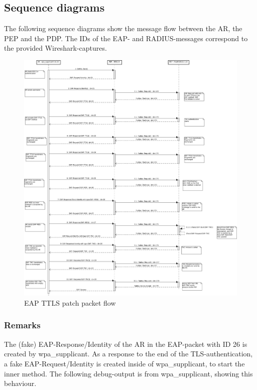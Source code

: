 \subsection{Sequence diagrams}
The following sequence diagrams show the message flow between the AR, the PEP and the PDP.
The IDs of the EAP- and RADIUS-messages correspond to the provided Wireshark-captures.

\begin{figure}[ht]
 \centering
 \includegraphics[width=\textwidth]{freeradius-eapttls-patch/diagrams/packet-flow-complete.png}
 \caption{EAP TTLS patch packet flow}
 \label{fig:eapttls-patch-flow-1}
\end{figure}

\subsubsection*{Remarks}
The (fake) EAP-Response/Identity of the AR in the EAP-packet with ID 26 is created by wpa\_supplicant.
As a response to the end of the TLS-authentication, a fake EAP-Request/Identity is created inside of wpa\_supplicant,
to start the inner method.
The following debug-output is from wpa\_supplicant, showing this behaviour.

